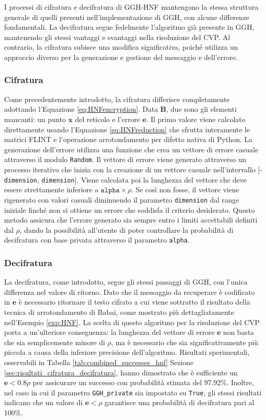 I processi di cifratura e decifratura di GGH-HNF mantengono la stessa struttura generale 
di quelli presenti nell'implementazione di GGH, con alcune differenze fondamentali. 
La decifratura segue 
fedelmente l'algoritmo già presente in GGH, mantenendo gli stessi vantaggi e svantaggi
nella risoluzione del CVP. Al contrario, la cifratura subisce una modifica significativa, 
poiché utilizza un approccio diverso per la generazione e gestione del messaggio e 
dell'errore.

\subsubsection{Cifratura}

Come precedentemente introdotto, la cifratura differisce completamente adottando 
l'Equazione \ref{eq:HNFencryption}. Data $\mathbf{B}$, due sono gli elementi mancanti: un punto $\mathbf{x}$ 
del reticolo e l'errore $\mathbf{e}$. Il primo valore viene calcolato direttamente usando
l'Equazione \ref{eq:HNFreduction}  che sfrutta interamente le matrici FLINT e l'operazione 
arrotondamento per difetto nativa di Python. 
La generazione dell'errore utilizza una funzione che crea un vettore di errore casuale
attraverso il modulo \texttt{Random}. Il vettore di errore viene generato attraverso un processo 
iterativo che inizia con la creazione di un vettore casuale nell'intervallo 
[-\texttt{dimension}, \texttt{dimension}]. Viene calcolata poi la lunghezza del vettore che 
deve essere strettamente inferiore a $\texttt{alpha}\times\rho$. Se così non fosse, il vettore 
viene rigenerato con valori casuali diminuendo il parametro \texttt{dimension} dal range 
iniziale finché non si ottiene un errore che soddisfa il criterio desiderato. 
Questo metodo assicura che l'errore generato sia sempre entro i limiti accettabili definiti
dal $\rho$, dando la possibilità all'utente di poter controllare la probabilità di decifratura
con base privata attraverso il parametro \texttt{alpha}.
\subsubsection{Decifratura}

La decifratura, come introdotto, segue gli stessi passaggi di GGH, con l'unica differenza 
nel valore di ritorno. Dato che il messaggio da recuperare è codificato in $\mathbf{e}$ è
necessario ritornare il testo cifrato a cui viene sottratto il risultato della tecnica
di arrotondamento di Babai, come mostrato più dettagliatamente nell'Esempio \ref{exp:HNF}. 
La scelta di questo algoritmo per la risoluzione del CVP porta a un'ulteriore conseguenza:
la lunghezza del vettore di errore $\mathbf{e}$ non basta che sia semplicemente minore di $\rho$, 
ma è necessario che sia significativamente più piccola a causa della inferiore precisione dell'algoritmo. 
Risultati sperimentali, osservabili in Tabella \ref{tab:combined_successes_hnf} Sezione 
\ref{sec:risultati_cifratura_decifratura}, hanno dimostrato che è sufficiente un 
$\mathbf{e} < 0.8\rho$ per assicurare un successo con probabilità stimata del 97.92\%. 
Inoltre, nel caso in cui il parametro \texttt{GGH\_private} sia impostato su \texttt{True}, 
gli stessi risultati indicano che un valore di $\mathbf{e} < \rho$ garantisce una probabilità di 
decifratura pari al 100\%.
